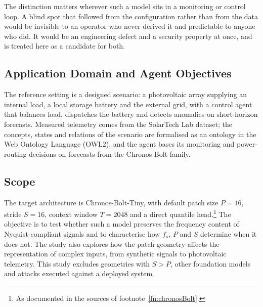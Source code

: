 The distinction matters wherever such a model sits in a monitoring or control loop. A blind spot that followed from the configuration rather than from the data would be invisible to an operator who never derived it and predictable to anyone who did. It would be an engineering defect and a security property at once, and is treated here as a candidate for both.

\subsection*{Application Domain and Agent Objectives}
The reference setting is a designed scenario: a photovoltaic array supplying an internal load, a local storage battery and the external grid, with a control agent that balances load, dispatches the battery and detects anomalies on short-horizon forecasts. Measured telemetry comes from the SolarTech Lab dataset\autocite{levaPhotovoltaicPowerWeather2020}; the concepts, states and relations of the scenario are formalised as an ontology in the Web Ontology Language (OWL2), and the agent bases its monitoring and power-routing decisions on forecasts from the Chronos-Bolt family.

\subsection*{Scope}
The target architecture is Chronos-Bolt-Tiny, with default patch size $P=16$, stride $S=16$, context window $T=2048$ and a direct quantile head.\footnote{As documented in the sources of footnote~\ref{fn:chronosBolt}.} The objective is to test whether such a model preserves the frequency content of Nyquist-compliant signals and to characterise how $f_s$, $P$ and $S$ determine when it does not. The study also explores how the patch geometry affects the representation of complex inputs, from synthetic signals to photovoltaic telemetry. This study excludes geometries with $S>P$, other foundation models and attacks executed against a deployed system.

